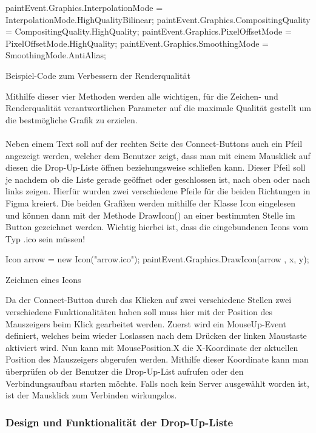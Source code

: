 \begin{program}[H]
\begin{CSharpCode}
paintEvent.Graphics.InterpolationMode = InterpolationMode.HighQualityBilinear;
paintEvent.Graphics.CompositingQuality = CompositingQuality.HighQuality;
paintEvent.Graphics.PixelOffsetMode = PixelOffsetMode.HighQuality;
paintEvent.Graphics.SmoothingMode = SmoothingMode.AntiAlias;
\end{CSharpCode}
\caption{Beispiel-Code zum Verbessern der Renderqualität}
\end{program}
\noindent 
Mithilfe dieser vier Methoden werden alle wichtigen, für die Zeichen- und Renderqualität verantwortlichen Parameter auf die maximale Qualität gestellt um die bestmögliche Grafik zu erzielen. 
\\ \ \\
Neben einem Text soll auf der rechten Seite des Connect-Buttons auch ein Pfeil angezeigt werden, welcher dem Benutzer zeigt, dass man mit einem Mausklick auf diesen die Drop-Up-Liste öffnen beziehungsweise schließen kann. Dieser Pfeil soll je nachdem ob die Liste gerade geöffnet oder geschlossen ist, nach oben oder nach links zeigen. Hierfür wurden zwei verschiedene Pfeile für die beiden Richtungen in Figma kreiert. Die beiden Grafiken werden mithilfe der Klasse Icon eingelesen und können dann mit der Methode DrawIcon() an einer bestimmten Stelle im Button gezeichnet werden. Wichtig hierbei ist, dass die eingebundenen Icons vom Typ .ico sein müssen! 

\begin{program}[H]
\begin{CSharpCode}
Icon arrow = new Icon("arrow.ico");
paintEvent.Graphics.DrawIcon(arrow , x, y);
\end{CSharpCode}
\caption{Zeichnen eines Icons}
\end{program}
\noindent 
Da der Connect-Button durch das Klicken auf zwei verschiedene Stellen zwei verschiedene Funktionalitäten haben soll muss hier mit der Position des Mauszeigers beim Klick gearbeitet werden. Zuerst wird ein MouseUp-Event definiert, welches beim wieder Loslassen nach dem Drücken der linken Maustaste aktiviert wird. Nun kann mit MousePosition.X die X-Koordinate der aktuellen Position des Mauszeigers abgerufen werden. Mithilfe dieser Koordinate kann man überprüfen ob der Benutzer die Drop-Up-List aufrufen oder den Verbindungsaufbau starten möchte. Falls noch kein Server ausgewählt worden ist, ist der Mausklick zum Verbinden wirkungslos.

\subsubsection{Design und Funktionalität der Drop-Up-Liste}

